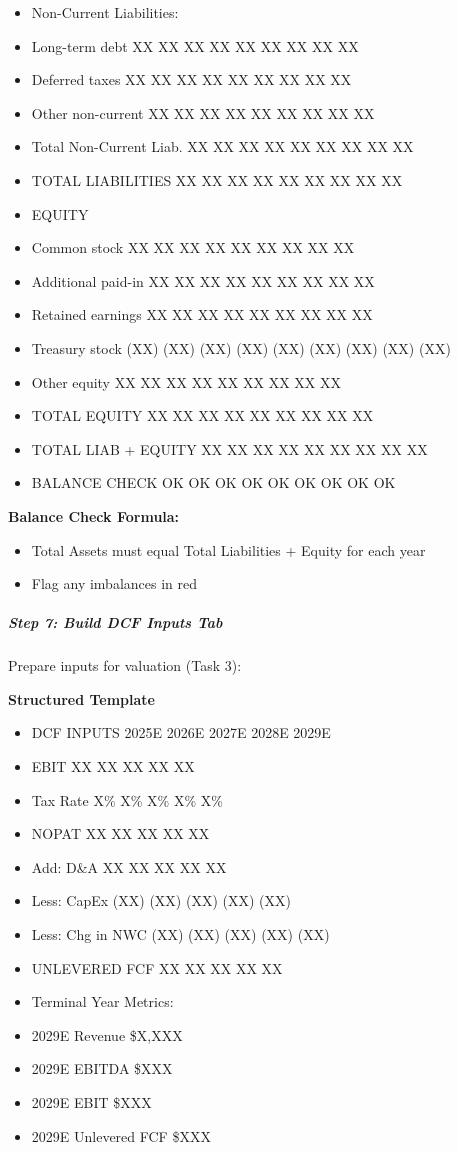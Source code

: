 \documentclass[11pt]{article}
\begin{document}
\begin{itemize}[leftmargin=*,itemsep=2pt,topsep=2pt]
\item {} Non-Current Liabilities:
\item {} Long-term debt XX XX XX XX XX XX XX XX XX
\item {} Deferred taxes XX XX XX XX XX XX XX XX XX
\item {} Other non-current XX XX XX XX XX XX XX XX XX
\item {} Total Non-Current Liab. XX XX XX XX XX XX XX XX XX
\item {} TOTAL LIABILITIES XX XX XX XX XX XX XX XX XX
\item {} EQUITY
\item {} Common stock XX XX XX XX XX XX XX XX XX
\item {} Additional paid-in XX XX XX XX XX XX XX XX XX
\item {} Retained earnings XX XX XX XX XX XX XX XX XX
\item {} Treasury stock (XX) (XX) (XX) (XX) (XX) (XX) (XX) (XX) (XX)
\item {} Other equity XX XX XX XX XX XX XX XX XX
\item {} TOTAL EQUITY XX XX XX XX XX XX XX XX XX
\item {} TOTAL LIAB + EQUITY XX XX XX XX XX XX XX XX XX
\item {} BALANCE CHECK OK OK OK OK OK OK OK OK OK
\end{itemize}

\textbf{Balance Check Formula:}

\begin{itemize}[leftmargin=*,itemsep=2pt,topsep=2pt]
\item {} Total Assets must equal Total Liabilities + Equity for each year
\item {} Flag any imbalances in red
\end{itemize}

\subparagraph{Step 7: Build DCF Inputs Tab}\mbox{}\par

Prepare inputs for valuation (Task 3):


\textbf{Structured Template}
\begin{itemize}[leftmargin=*,itemsep=2pt,topsep=2pt]
\item {} DCF INPUTS 2025E 2026E 2027E 2028E 2029E
\item {} EBIT XX XX XX XX XX
\item {} Tax Rate X\% X\% X\% X\% X\%
\item {} NOPAT XX XX XX XX XX
\item {} Add: D\&A XX XX XX XX XX
\item {} Less: CapEx (XX) (XX) (XX) (XX) (XX)
\item {} Less: Chg in NWC (XX) (XX) (XX) (XX) (XX)
\item {} UNLEVERED FCF XX XX XX XX XX
\item {} Terminal Year Metrics:
\item {} 2029E Revenue \$X,XXX
\item {} 2029E EBITDA \$XXX
\item {} 2029E EBIT \$XXX
\item {} 2029E Unlevered FCF \$XXX
\end{itemize}
\end{document}
